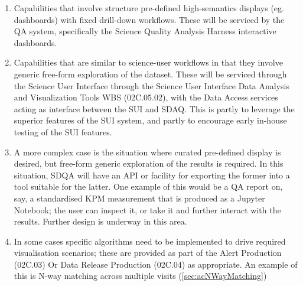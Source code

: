 \begin{enumerate}

\item Capabilities that involve structure pre-defined high-semantics displays (eg. dashboards) with fixed drill-down workflows. These will be serviced by the QA system, specifically the Science Quality Analysis Harness interactive dashboards. 

\item Capabilities that are similar to science-user workflows in that they involve generic free-form exploration of the dataset. These will be serviced through the Science User Interface through the Science User Interface Data Analysis and Visualization Tools WBS (02C.05.02), with the Data Access services acting as interface between the SUI and SDAQ. This is partly to leverage the superior features of the SUI system, and partly to encourage early in-house testing of the SUI features. 

\item A more complex case is the situation where curated pre-defined display is desired, but free-form generic exploration of the results is required. In this situation, SDQA will have an API or facility for exporting the former into a tool suitable for the latter. One example of this would be a QA report on, say, a standardised KPM measurement that is produced as a Jupyter Notebook; the user can inspect it, or take it and further interact with the results. Further design is underway in this area. 

\item In some cases specific algorithms need to be implemented to drive required visualisation scenarios; these are provided as part of the Alert Production (02C.03) Or Data Release Production (02C.04) as appropriate. An example of this is N-way matching across multiple visits (\ref{sec:acNWayMatching})

\end{enumerate}

